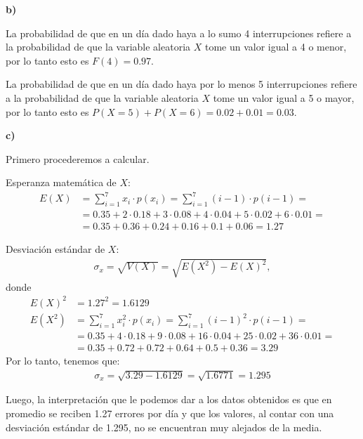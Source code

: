 \documentclass[11pt]{article}
\begin{document}
\textbf{b)} \par
La probabilidad de que en un d\'ia dado haya a lo sumo 4 interrupciones refiere a la probabilidad de que la variable aleatoria $X$ tome un valor igual a 4 o menor, por lo tanto esto es $F(4) = 0.97$. \par
La probabilidad de que en un d\'ia dado haya por lo menos 5 interrupciones refiere a la probabilidad de que la variable aleatoria $X$ tome un valor igual a 5 o mayor, por lo tanto esto es $P(X=5) + P(X=6) = 0.02 + 0.01 = 0.03$.


\textbf{c)} \par
Primero procederemos a calcular. 

Esperanza matem\'atica de $X$:
\begin{align*}
    E(X)& = \sum_{i=1}^{7} x_i \cdot p(x_i) = \sum_{i=1}^{7} (i-1) \cdot p(i-1) = \\
        & = 0.35 + 2 \cdot 0.18 + 3 \cdot 0.08 + 4 \cdot 0.04 + 5 \cdot 0.02 + 6 \cdot 0.01 = \\
        & = 0.35 + 0.36 + 0.24 + 0.16 + 0.1 + 0.06 = 1.27
\end{align*}

Desviaci\'on est\'andar de $X$:
\begin{align*}
    \sigma_x = \sqrt{V(X)} = \sqrt{E(X^2) - E(X)^2},
\end{align*}
donde
\begin{align*}
    E(X)^2 & = 1.27^2 = 1.6129 \\
    E(X^2) & = \sum_{i=1}^{7} x_i^2 \cdot p(x_i) = \sum_{i=1}^{7} (i-1)^2 \cdot p(i-1) = \\
           & = 0.35 + 4 \cdot 0.18 + 9 \cdot 0.08 + 16 \cdot 0.04 + 25 \cdot 0.02 + 36 \cdot 0.01 = \\
           & = 0.35 + 0.72 + 0.72 + 0.64 + 0.5 + 0.36 = 3.29
\end{align*}
Por lo tanto, tenemos que:
\begin{align*}
    \sigma_x = \sqrt{3.29 - 1.6129} = \sqrt{1.6771} = 1.295
\end{align*}

Luego, la interpretaci\'on que le podemos dar a los datos obtenidos es que en promedio se reciben 1.27 errores por d\'ia y que los valores, al contar con una desviaci\'on est\'andar de 1.295, no se encuentran muy alejados de la media.

\end{document}
